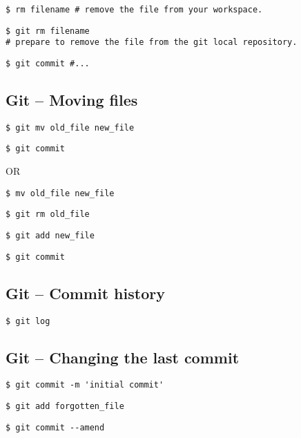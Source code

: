 \documentclass[11pt,twoside]{article}
\begin{document}
\begin{verbatim}
$ rm filename # remove the file from your workspace.
\end{verbatim}
\begin{verbatim}
$ git rm filename 
# prepare to remove the file from the git local repository.
\end{verbatim}
\begin{verbatim}
$ git commit #... 
\end{verbatim}

\subsection*{Git -- Moving files}

\begin{verbatim}
$ git mv old_file new_file
\end{verbatim}
\begin{verbatim}
$ git commit
\end{verbatim}

OR

\begin{verbatim}
$ mv old_file new_file
\end{verbatim}
\begin{verbatim}
$ git rm old_file
\end{verbatim}
\begin{verbatim}
$ git add new_file
\end{verbatim}
\begin{verbatim}
$ git commit
\end{verbatim}

\subsection*{Git -- Commit history}

\begin{verbatim}
$ git log
\end{verbatim}

\subsection*{Git -- Changing the last commit}

\begin{verbatim}
$ git commit -m 'initial commit'
\end{verbatim}
\begin{verbatim}
$ git add forgotten_file
\end{verbatim}
\begin{verbatim}
$ git commit --amend
\end{verbatim}
\end{document}
